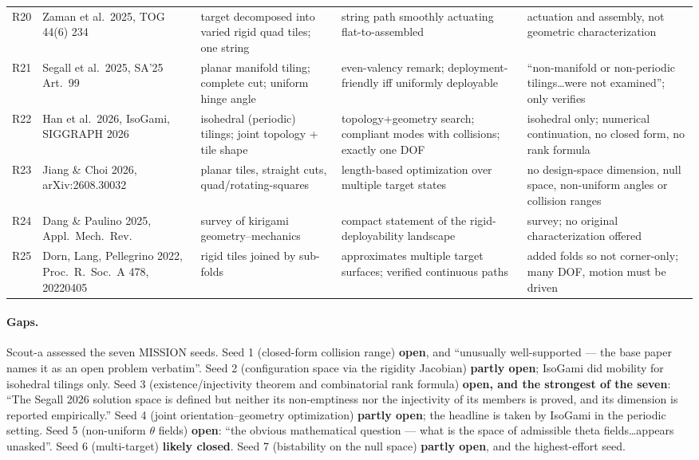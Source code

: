 \documentclass[10pt,a4paper]{article}
\begin{document}
\begin{longtable}{@{}p{6mm}p{36mm}p{40mm}p{38mm}p{40mm}@{}}
R20 & Zaman et al.\ 2025, TOG 44(6) 234 & target decomposed into varied rigid quad tiles; one string & string path smoothly actuating flat-to-assembled & actuation and assembly, not geometric characterization \\
R21 & Segall et al.\ 2025, SA'25 Art.~99 & planar manifold tiling; complete cut; uniform hinge angle & even-valency remark; deployment-friendly iff uniformly deployable & ``non-manifold or non-periodic tilings\ldots were not examined''; only verifies \\
R22 & Han et al.\ 2026, IsoGami, SIGGRAPH 2026 & isohedral (periodic) tilings; joint topology + tile shape & topology+geometry search; compliant modes with collisions; exactly one DOF & isohedral only; numerical continuation, no closed form, no rank formula \\
R23 & Jiang \& Choi 2026, arXiv:2608.30032 & planar tiles, straight cuts, quad/rotating-squares & length-based optimization over multiple target states & no design-space dimension, null space, non-uniform angles or collision ranges \\
R24 & Dang \& Paulino 2025, Appl.\ Mech.\ Rev. & survey of kirigami geometry--mechanics & compact statement of the rigid-deployability landscape & survey; no original characterization offered \\
R25 & Dorn, Lang, Pellegrino 2022, Proc.\ R.\ Soc.\ A 478, 20220405 & rigid tiles joined by sub-folds & approximates multiple target surfaces; verified continuous paths & added folds so not corner-only; many DOF, motion must be driven \\
\bottomrule
\end{longtable}

\paragraph{Gaps.} Scout-a assessed the seven MISSION seeds. Seed 1 (closed-form collision range)
\textbf{open}, and ``unusually well-supported --- the base paper names it as an open problem
verbatim''. Seed 2 (configuration space via the rigidity Jacobian) \textbf{partly open};
IsoGami did mobility for isohedral tilings only. Seed 3 (existence/injectivity theorem and
combinatorial rank formula) \textbf{open, and the strongest of the seven}: ``The Segall 2026
solution space is defined but neither its non-emptiness nor the injectivity of its members is
proved, and its dimension is reported empirically.'' Seed 4 (joint orientation--geometry
optimization) \textbf{partly open}; the headline is taken by IsoGami in the periodic setting.
Seed 5 (non-uniform $\theta$ fields) \textbf{open}: ``the obvious mathematical question ---
what is the space of admissible theta fields\ldots appears unasked''. Seed 6 (multi-target)
\textbf{likely closed}. Seed 7 (bistability on the null space) \textbf{partly open}, and the
highest-effort seed.
\end{document}
